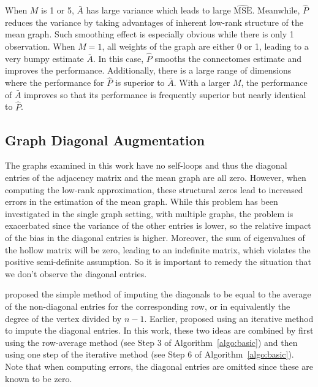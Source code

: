 \documentclass[journal,twoside,web]{ieeecolor}
\begin{document}
When $M$ is 1 or 5, $\bar{A}$ has large variance which leads to large $\hat{\mathrm{MSE}}$. Meanwhile, $\hat{P}$ reduces the variance by taking advantages of inherent low-rank structure of the mean graph. Such smoothing effect is especially obvious while there is only 1 observation. When $M = 1$, all weights of the graph are either 0 or 1, leading to a very bumpy estimate $\bar{A}$. In this case, $\hat{P}$ smooths the connectomes estimate and improves the performance.
Additionally, there is a large range of dimensions where the performance for $\hat{P}$ is superior to $\bar{A}$.
With a larger $M$, the performance of $\bar{A}$ improves so that its performance is frequently superior but nearly identical to $\hat{P}$.




\subsection{Graph Diagonal Augmentation}
\label{section:diag_aug}
The graphs examined in this work have no self-loops and thus the diagonal entries of the adjacency matrix and the mean graph are all zero.
However, when computing the low-rank approximation, these structural zeros lead to increased errors in the estimation of the mean graph.
While this problem has been investigated in the single graph setting, with multiple graphs, the problem is exacerbated since the variance of the other entries is lower, so the relative impact of the bias in the diagonal entries is higher.
Moreover, the sum of eigenvalues of the hollow matrix will be zero, leading to an indefinite matrix, which violates the positive semi-definite assumption. So it is important to remedy the situation that we don't observe the diagonal entries.

  proposed the simple method of imputing the diagonals to be equal to the average of the non-diagonal entries for the corresponding row, or in equivalently the degree of the vertex divided by $n-1$.
Earlier,  proposed using an iterative method to impute the diagonal entries.
In this work, these two ideas are combined by first using the row-average method  (see Step 3 of Algorithm~\ref{algo:basic}) and then using one step of the iterative method (see Step 6 of Algorithm~\ref{algo:basic}).
Note that when computing errors, the diagonal entries are omitted since these are known to be zero.
\end{document}
